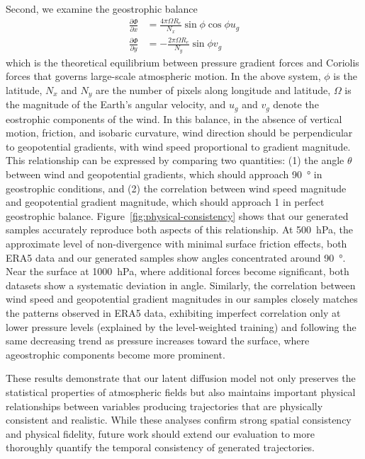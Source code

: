 \begin{subappendices}
Second, we examine the geostrophic balance
\begin{align}
    \frac{\partial \Phi}{\partial x} & = \frac{4 \pi \Omega R_e}{N_x} \sin{\phi} \cos{\phi} u_g\\
    \frac{\partial \Phi}{\partial y} & = -\frac{2 \pi \Omega R_e}{N_y} \sin{\phi} v_g
\end{align}
which is the theoretical equilibrium between pressure gradient forces and Coriolis forces that governs large-scale atmospheric motion. In the above system, $\phi$ is the latitude, $N_x$ and $N_y$ are the number of pixels along longitude and latitude, $\Omega$ is the magnitude of the Earth's angular velocity, and $u_g$ and $v_g$ denote the eostrophic components of the wind. In this balance, in the absence of vertical motion, friction, and isobaric curvature, wind direction should be perpendicular to geopotential gradients, with wind speed proportional to gradient magnitude. This relationship can be expressed by comparing two quantities: (1) the angle $\theta$ between wind and geopotential gradients, which should approach \qty{90}{\degree} in geostrophic conditions, and (2) the correlation between wind speed magnitude and geopotential gradient magnitude, which should approach 1 in perfect geostrophic balance. Figure~\ref{fig:physical-consistency} shows that our generated samples accurately reproduce both aspects of this relationship. At \qty{500}{\hecto\pascal}, the approximate level of non-divergence with minimal surface friction effects, both ERA5 data and our generated samples show angles concentrated around \qty{90}{\degree}. Near the surface at \qty{1000}{\hecto\pascal}, where additional forces become significant, both datasets show a systematic deviation in angle. Similarly, the correlation between wind speed and geopotential gradient magnitudes in our samples closely matches the patterns observed in ERA5 data, exhibiting imperfect correlation only at lower pressure levels (explained by the level-weighted training) and following the same decreasing trend as pressure increases toward the surface, where ageostrophic components become more prominent.

These results demonstrate that our latent diffusion model not only preserves the statistical properties of atmospheric fields but also maintains important physical relationships between variables producing trajectories that are physically consistent and realistic. While these analyses confirm strong spatial consistency and physical fidelity, future work should extend our evaluation to more thoroughly quantify the temporal consistency of generated trajectories.


\end{subappendices}
